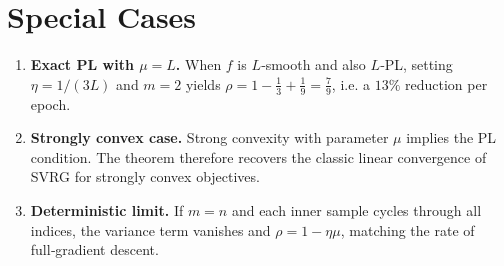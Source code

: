 \documentclass[11pt]{article}
\begin{document}
\section*{Special Cases}
\begin{enumerate}
    \item \textbf{Exact PL with $\mu=L$.} When $f$ is $L$‑smooth and also $L$‑PL, setting $\eta=1/(3L)$ and $m=2$ yields $\rho=1-\frac{1}{3}+\frac{1}{9}= \frac{7}{9}$, i.e. a $13\%$ reduction per epoch.
    \item \textbf{Strongly convex case.} Strong convexity with parameter $\mu$ implies the PL condition. The theorem therefore recovers the classic linear convergence of SVRG for strongly convex objectives.
    \item \textbf{Deterministic limit.} If $m=n$ and each inner sample cycles through all indices, the variance term vanishes and $\rho=1-\eta\mu$, matching the rate of full‑gradient descent.
\end{enumerate}
\end{document}
